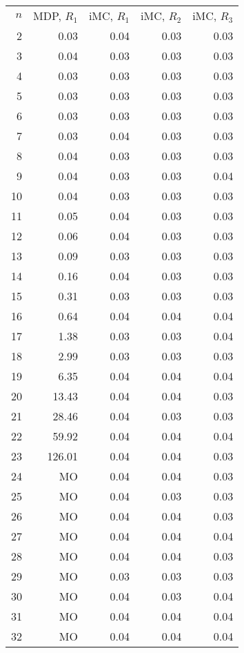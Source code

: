 \begin{tabular}{rrrrr}
\toprule
 $n$ & MDP, $R_1$ & iMC, $R_1$ & iMC, $R_2$ & iMC, $R_3$ \\
 2   & 0.03       & 0.04       & 0.03       & 0.03       \\
 3   & 0.04       & 0.03       & 0.03       & 0.03       \\
 4   & 0.03       & 0.03       & 0.03       & 0.03       \\
 5   & 0.03       & 0.03       & 0.03       & 0.03       \\
 6   & 0.03       & 0.03       & 0.03       & 0.03       \\
 7   & 0.03       & 0.04       & 0.03       & 0.03       \\
 8   & 0.04       & 0.03       & 0.03       & 0.03       \\
 9   & 0.04       & 0.03       & 0.03       & 0.04       \\
 10  & 0.04       & 0.03       & 0.03       & 0.03       \\
 11  & 0.05       & 0.04       & 0.03       & 0.03       \\
 12  & 0.06       & 0.04       & 0.03       & 0.03       \\
 13  & 0.09       & 0.03       & 0.03       & 0.03       \\
 14  & 0.16       & 0.04       & 0.03       & 0.03       \\
 15  & 0.31       & 0.03       & 0.03       & 0.03       \\
 16  & 0.64       & 0.04       & 0.04       & 0.04       \\
 17  & 1.38       & 0.03       & 0.03       & 0.04       \\
 18  & 2.99       & 0.03       & 0.03       & 0.03       \\
 19  & 6.35       & 0.04       & 0.04       & 0.04       \\
 20  & 13.43      & 0.04       & 0.04       & 0.03       \\
 21  & 28.46      & 0.04       & 0.03       & 0.03       \\
 22  & 59.92      & 0.04       & 0.04       & 0.04       \\
 23  & 126.01     & 0.04       & 0.04       & 0.03       \\
 24  & MO         & 0.04       & 0.04       & 0.03       \\
 25  & MO         & 0.04       & 0.03       & 0.03       \\
 26  & MO         & 0.04       & 0.04       & 0.03       \\
 27  & MO         & 0.04       & 0.04       & 0.04       \\
 28  & MO         & 0.04       & 0.04       & 0.03       \\
 29  & MO         & 0.03       & 0.03       & 0.03       \\
 30  & MO         & 0.04       & 0.03       & 0.04       \\
 31  & MO         & 0.04       & 0.04       & 0.04       \\
 32  & MO         & 0.04       & 0.04       & 0.04       \\
\bottomrule
\end{tabular}
